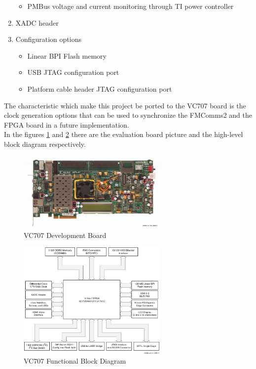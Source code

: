 \begin{enumerate}
  \begin{itemize}
    \item PMBus voltage and current monitoring through TI power controller
  \end{itemize}

  \item XADC header
  \item Configuration options

  \begin{itemize}
    \item Linear BPI Flash memory
    \item USB JTAG configuration port
    \item Platform cable header JTAG configuration port
  \end{itemize}

\end{enumerate}

The characteristic which make this project be ported to the VC707 board is the
clock generation options that can be used to synchronize the FMComms2 and the FPGA
board in a future implementation.\\

In the figures \ref{fig:vc707} and
\ref{fig:vc707bd} there are the evaluation board picture and the high-level block
diagram respectively.\\

\begin{figure}[htbp]
    \centering
    \includegraphics[width=0.65\textwidth]{./figures/vc707}
    \caption{ VC707 Development Board
    \label{fig:vc707}}
\end{figure}

\begin{figure}[htbp]
    \centering
    \includegraphics[width=0.65\textwidth]{./figures/vc707_bd}
    \caption{ VC707 Functional Block Diagram
    \label{fig:vc707bd}}
\end{figure}

